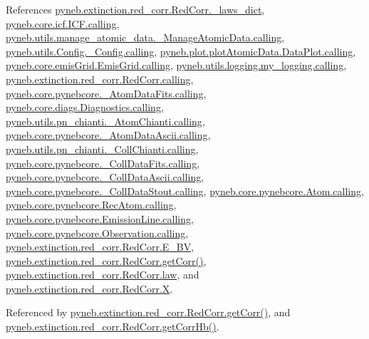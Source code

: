 \begin{DoxyVerb}
References \hyperlink{red__corr_8py_source_l00060}{pyneb.\-extinction.\-red\-\_\-corr.\-Red\-Corr.\-\_\-laws\-\_\-dict}, \hyperlink{icf_8py_source_l00016}{pyneb.\-core.\-icf.\-I\-C\-F.\-calling}, \hyperlink{manage__atomic__data_8py_source_l00018}{pyneb.\-utils.\-manage\-\_\-atomic\-\_\-data.\-\_\-\-Manage\-Atomic\-Data.\-calling}, \hyperlink{_config_8py_source_l00032}{pyneb.\-utils.\-Config.\-\_\-\-Config.\-calling}, \hyperlink{plot_atomic_data_8py_source_l00042}{pyneb.\-plot.\-plot\-Atomic\-Data.\-Data\-Plot.\-calling}, \hyperlink{emis_grid_8py_source_l00044}{pyneb.\-core.\-emis\-Grid.\-Emis\-Grid.\-calling}, \hyperlink{logging_8py_source_l00044}{pyneb.\-utils.\-logging.\-my\-\_\-logging.\-calling}, \hyperlink{red__corr_8py_source_l00059}{pyneb.\-extinction.\-red\-\_\-corr.\-Red\-Corr.\-calling}, \hyperlink{pynebcore_8py_source_l00097}{pyneb.\-core.\-pynebcore.\-\_\-\-Atom\-Data\-Fits.\-calling}, \hyperlink{diags_8py_source_l00169}{pyneb.\-core.\-diags.\-Diagnostics.\-calling}, \hyperlink{pn__chianti_8py_source_l00240}{pyneb.\-utils.\-pn\-\_\-chianti.\-\_\-\-Atom\-Chianti.\-calling}, \hyperlink{pynebcore_8py_source_l00318}{pyneb.\-core.\-pynebcore.\-\_\-\-Atom\-Data\-Ascii.\-calling}, \hyperlink{pn__chianti_8py_source_l00434}{pyneb.\-utils.\-pn\-\_\-chianti.\-\_\-\-Coll\-Chianti.\-calling}, \hyperlink{pynebcore_8py_source_l00585}{pyneb.\-core.\-pynebcore.\-\_\-\-Coll\-Data\-Fits.\-calling}, \hyperlink{pynebcore_8py_source_l00936}{pyneb.\-core.\-pynebcore.\-\_\-\-Coll\-Data\-Ascii.\-calling}, \hyperlink{pynebcore_8py_source_l01156}{pyneb.\-core.\-pynebcore.\-\_\-\-Coll\-Data\-Stout.\-calling}, \hyperlink{pynebcore_8py_source_l01229}{pyneb.\-core.\-pynebcore.\-Atom.\-calling}, \hyperlink{pynebcore_8py_source_l02643}{pyneb.\-core.\-pynebcore.\-Rec\-Atom.\-calling}, \hyperlink{pynebcore_8py_source_l03385}{pyneb.\-core.\-pynebcore.\-Emission\-Line.\-calling}, \hyperlink{pynebcore_8py_source_l03541}{pyneb.\-core.\-pynebcore.\-Observation.\-calling}, \hyperlink{red__corr_8py_source_l00203}{pyneb.\-extinction.\-red\-\_\-corr.\-Red\-Corr.\-E\-\_\-\-B\-V}, \hyperlink{red__corr_8py_source_l00211}{pyneb.\-extinction.\-red\-\_\-corr.\-Red\-Corr.\-get\-Corr()}, \hyperlink{red__corr_8py_source_l00205}{pyneb.\-extinction.\-red\-\_\-corr.\-Red\-Corr.\-law}, and \hyperlink{red__corr_8py_source_l00180}{pyneb.\-extinction.\-red\-\_\-corr.\-Red\-Corr.\-X}.



Referenced by \hyperlink{red__corr_8py_source_l00211}{pyneb.\-extinction.\-red\-\_\-corr.\-Red\-Corr.\-get\-Corr()}, and \hyperlink{red__corr_8py_source_l00240}{pyneb.\-extinction.\-red\-\_\-corr.\-Red\-Corr.\-get\-Corr\-Hb()}.



\end{DoxyVerb}
